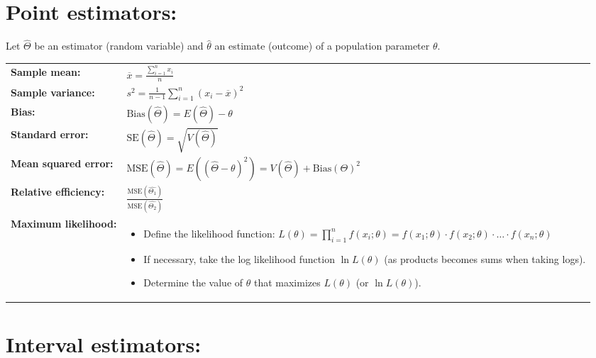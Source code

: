 \documentclass[11pt,a4paper,english]{article} %
\begin{document}
\section*{Point estimators:}
Let $\hat{\Theta}$ be an estimator (random variable) and $\hat{\theta}$ an estimate (outcome) of a population parameter $\theta$.\medskip

\begin{center}
    \renewcommand{\arraystretch}{1.8}
    \begin{tabular}{m{}m{}}
            \textbf{Sample mean:} & $\overline{x} = \frac{\sum_{i=1}^{n} x_{i}}{n}$ \\
            \textbf{Sample variance:} & $s^2 = \frac{1}{n-1}\sum_{i=1}^{n} (x_{i} - \overline{x})^2$ \\
            \textbf{Bias:}  & $\textrm{Bias}(\hat{\Theta}) = E(\hat{\Theta}) - \theta$ \\
            \textbf{Standard error:} & $\textrm{SE}(\hat{\Theta}) = \sqrt{V(\hat{\Theta})}$ \\
            \textbf{Mean squared error:} & $\textrm{MSE}(\hat{\Theta}) = E\left( (\hat{\Theta} - \theta)^2\right)=  V(\hat{\Theta}) + \textrm{Bias}(\Theta)^2$ \\
            \textbf{Relative efficiency:} & $\frac{\textrm{MSE}(\hat{\Theta_1})}{\textrm{MSE}(\hat{\Theta_2})}$ \\[2ex]
            \textbf{Maximum likelihood:} & \begin{itemize}
                \item Define the likelihood function: $L(\theta) = \prod_{i=1}^n f(x_i; \theta) = f(x_1; \theta)\cdot f(x_2; \theta)\cdot\ldots\cdot f(x_n; \theta)$
                \item If necessary, take the log likelihood function $\ln{L(\theta)}$ (as products becomes sums when taking logs).
                \item Determine the value of $\theta$ that maximizes $L(\theta)$ (or $\ln{L(\theta)}$).
            \end{itemize} \\
    \end{tabular}
\end{center}


\section*{Interval estimators:}
\end{document}
